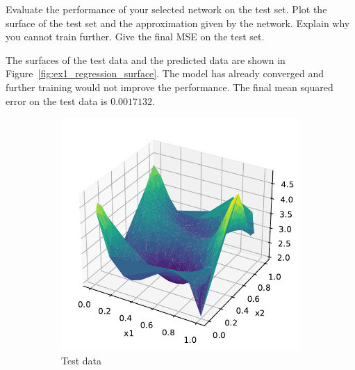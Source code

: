 \documentclass{article}
\newenvironment{task}[1]{
  \begin{tcolorbox}[
    colback=highlight!5!white,
    colframe=highlight,
    title={Task #1}
  ]
}{
  \end{tcolorbox}
}
\begin{document}
\begin{task}{1.4.3}
  Evaluate the performance of your selected network on the test set. Plot the surface of the test
  set and the approximation given by the network. Explain why you cannot train further. Give the
  final MSE on the test set.
\end{task}

The surfaces of the test data and the predicted data are shown in
Figure~\ref{fig:ex1_regression_surface}. The model has already converged and further training would
not improve the performance. The final mean squared error on the test data is $0.0017132$.

\begin{figure}[ht!]
  \centering
  \begin{subfigure}{0.45\textwidth}
    \includegraphics[width=\textwidth]{ex1_regression_test.pdf}
    \caption{Test data}
    \label{fig:ex1_regression_test}
  \end{subfigure}
  \begin{subfigure}{0.45\textwidth}

\end{subfigure}
\end{figure}
\end{document}
